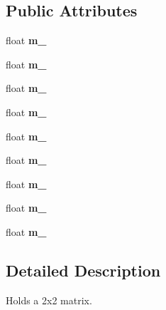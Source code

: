 \subsection*{Public Attributes}
\begin{DoxyCompactItemize}
\item 
\mbox{\label{classflounder_1_1matrix3x3_af0fb21acffd30565cdc1b76a169715f4}} 
float {\bfseries m\+\_}
\item 
\mbox{\label{classflounder_1_1matrix3x3_aef8bc8fb5515e7424a17c6af47f31396}} 
float {\bfseries m\+\_}
\item 
\mbox{\label{classflounder_1_1matrix3x3_a4fdea6e29388067f6db4e1d8cdeb1ed6}} 
float {\bfseries m\+\_}
\item 
\mbox{\label{classflounder_1_1matrix3x3_a64c6e1c0e30423e62a9bafe2e9358fd6}} 
float {\bfseries m\+\_}
\item 
\mbox{\label{classflounder_1_1matrix3x3_a979fbe4741c696c722402851e42c2561}} 
float {\bfseries m\+\_}
\item 
\mbox{\label{classflounder_1_1matrix3x3_a1e82a9865046c407c532bfd97bf3fe57}} 
float {\bfseries m\+\_}
\item 
\mbox{\label{classflounder_1_1matrix3x3_a703e8826098fe4c637b10d583553384e}} 
float {\bfseries m\+\_}
\item 
\mbox{\label{classflounder_1_1matrix3x3_a1164cf8908d5ba6a4caf5ee2475bde7c}} 
float {\bfseries m\+\_}
\item 
\mbox{\label{classflounder_1_1matrix3x3_a3f4f4da6b0d6de1ecfc23425d82e2ec6}} 
float {\bfseries m\+\_}
\end{DoxyCompactItemize}


\subsection{Detailed Description}
Holds a 2x2 matrix. 



